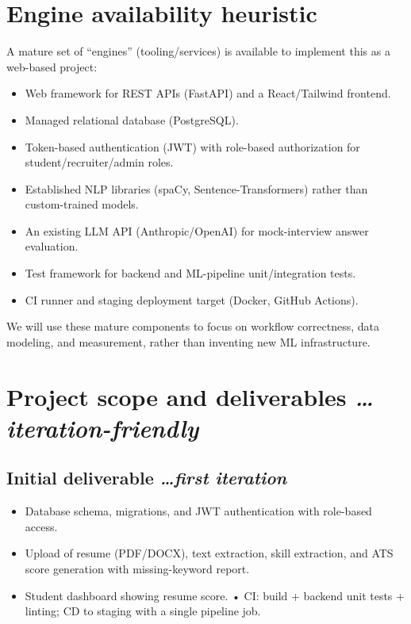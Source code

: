 \documentclass[11pt,a4paper]{article}
\newcommand{\BvrHint}[1]{%
  {\normalfont\normalsize\itshape\hfill #1}}
\begin{document}
\section{Engine availability heuristic}
A mature set of ``engines'' (tooling/services) is available to implement this as a web-based project:
\begin{itemize}[leftmargin=0.7cm]
    \item Web framework for REST APIs (FastAPI) and a React/Tailwind frontend. 
    \item Managed relational database (PostgreSQL). 
    \item Token-based authentication (JWT) with role-based authorization for student/recruiter/admin roles. 
    \item Established NLP libraries (spaCy, Sentence-Transformers) rather than custom-trained models. 
    \item An existing LLM API (Anthropic/OpenAI) for mock-interview answer evaluation. 
    \item Test framework for backend and ML-pipeline unit/integration tests. 
    \item CI runner and staging deployment target (Docker, GitHub Actions). 
\end{itemize}
We will use these mature components to focus on workflow correctness, data modeling, and measurement, rather than inventing new ML infrastructure.

\section{Project scope and deliverables %
\BvrHint{\ldots iteration-friendly}}
\subsection{Initial deliverable %
\BvrHint{\ldots first iteration}}
\begin{itemize}[leftmargin=0.7cm]
    \item Database schema, migrations, and JWT authentication with role-based access.
    \item  Upload of resume (PDF/DOCX), text extraction, skill extraction, and ATS score generation with missing-keyword report. 
    \item Student dashboard showing resume score. • CI: build + backend unit tests + linting; CD to staging with a single pipeline job.
\end{itemize}
\end{document}
